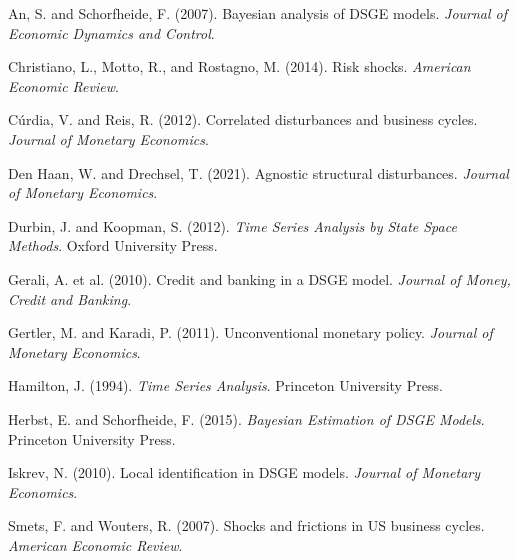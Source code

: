 \documentclass[11pt]{article}
\begin{document}

\begin{thebibliography}{}

An, S. and Schorfheide, F. (2007).
Bayesian analysis of DSGE models.
\textit{Journal of Economic Dynamics and Control}.

Christiano, L., Motto, R., and Rostagno, M. (2014).
Risk shocks.
\textit{American Economic Review}.

Cúrdia, V. and Reis, R. (2012).
Correlated disturbances and business cycles.
\textit{Journal of Monetary Economics}.

Den Haan, W. and Drechsel, T. (2021).
Agnostic structural disturbances.
\textit{Journal of Monetary Economics}.

Durbin, J. and Koopman, S. (2012).
\textit{Time Series Analysis by State Space Methods}.
Oxford University Press.

Gerali, A. et al. (2010).
Credit and banking in a DSGE model.
\textit{Journal of Money, Credit and Banking}.

Gertler, M. and Karadi, P. (2011).
Unconventional monetary policy.
\textit{Journal of Monetary Economics}.

Hamilton, J. (1994).
\textit{Time Series Analysis}.
Princeton University Press.

Herbst, E. and Schorfheide, F. (2015).
\textit{Bayesian Estimation of DSGE Models}.
Princeton University Press.

Iskrev, N. (2010).
Local identification in DSGE models.
\textit{Journal of Monetary Economics}.

Smets, F. and Wouters, R. (2007).
Shocks and frictions in US business cycles.
\textit{American Economic Review}.

\end{thebibliography}
\end{document}
